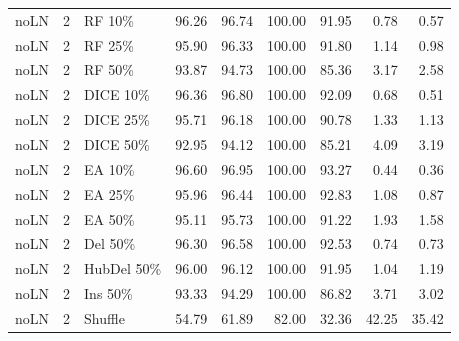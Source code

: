 {\begin{longtable}{rllrrrrrr}
noLN & 2 & RF 10\% & 96.26 & 96.74 & 100.00 & 91.95 & 0.78 & 0.57 \\
noLN & 2 & RF 25\% & 95.90 & 96.33 & 100.00 & 91.80 & 1.14 & 0.98 \\
noLN & 2 & RF 50\% & 93.87 & 94.73 & 100.00 & 85.36 & 3.17 & 2.58 \\
noLN & 2 & DICE 10\% & 96.36 & 96.80 & 100.00 & 92.09 & 0.68 & 0.51 \\
noLN & 2 & DICE 25\% & 95.71 & 96.18 & 100.00 & 90.78 & 1.33 & 1.13 \\
noLN & 2 & DICE 50\% & 92.95 & 94.12 & 100.00 & 85.21 & 4.09 & 3.19 \\
noLN & 2 & EA 10\% & 96.60 & 96.95 & 100.00 & 93.27 & 0.44 & 0.36 \\
noLN & 2 & EA 25\% & 95.96 & 96.44 & 100.00 & 92.83 & 1.08 & 0.87 \\
noLN & 2 & EA 50\% & 95.11 & 95.73 & 100.00 & 91.22 & 1.93 & 1.58 \\
noLN & 2 & Del 50\% & 96.30 & 96.58 & 100.00 & 92.53 & 0.74 & 0.73 \\
noLN & 2 & HubDel 50\% & 96.00 & 96.12 & 100.00 & 91.95 & 1.04 & 1.19 \\
noLN & 2 & Ins 50\% & 93.33 & 94.29 & 100.00 & 86.82 & 3.71 & 3.02 \\
noLN & 2 & Shuffle & 54.79 & 61.89 & 82.00 & 32.36 & 42.25 & 35.42 \\
\end{longtable}
}
